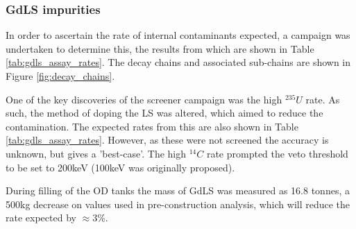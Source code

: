 \subsubsection{GdLS impurities}
\par
In order to ascertain the rate of internal contaminants expected, a campaign was undertaken \cite{scotthaselschwardt_thesis_ref} to determine this, the results from which are shown in Table \ref{tab:gdls_assay_rates}.
The decay chains and associated sub-chains are shown in Figure \ref{fig:decay_chains}.

\par
One of the key discoveries of the screener campaign was the high ${}^{235}U$ rate.
As such, the method of doping the LS was altered, which aimed to reduce the contamination.
The expected rates from this are also shown in Table \ref{tab:gdls_assay_rates}.
However, as these were not screened the accuracy is unknown, but gives a 'best-case'.
The high ${}^{14}{C}$ rate prompted the veto threshold to be set to 200keV (100keV was originally proposed).

\par
During filling of the OD tanks the mass of GdLS was measured as 16.8 tonnes, a 500kg decrease on values used in pre-construction analysis, which will reduce the rate expected by $\approx$3\%.


